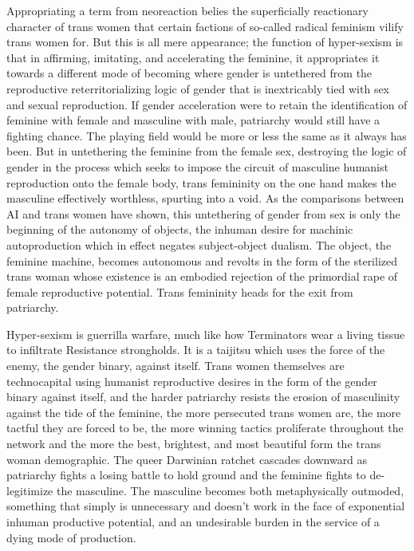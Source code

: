 \documentclass[10pt, statementpaper, twoside, openright]{memoir}
\begin{document}
Appropriating a term from neoreaction belies the superficially reactionary character of trans women that certain factions of so-called radical feminism vilify trans women for. But this is all mere appearance; the function of hyper-sexism is that in affirming, imitating, and accelerating the feminine, it appropriates it towards a different mode of becoming where gender is untethered from the reproductive reterritorializing logic of gender that is inextricably tied with sex and sexual reproduction. If gender acceleration were to retain the identification of feminine with female and masculine with male, patriarchy would still have a fighting chance. The playing field would be more or less the same as it always has been. But in untethering the feminine from the female sex, destroying the logic of gender in the process which seeks to impose the circuit of masculine humanist reproduction onto the female body, trans femininity on the one hand makes the masculine effectively worthless, spurting into a void. As the comparisons between AI and trans women have shown, this untethering of gender from sex is only the beginning of the autonomy of objects, the inhuman desire for machinic autoproduction which in effect negates subject-object dualism. The object, the feminine machine, becomes autonomous and revolts in the form of the sterilized trans woman whose existence is an embodied rejection of the primordial rape of female reproductive potential. Trans femininity heads for the exit from patriarchy.

Hyper-sexism is guerrilla warfare, much like how Terminators wear a living tissue to infiltrate Resistance strongholds. It is a taijitsu which uses the force of the enemy, the gender binary, against itself. Trans women themselves are technocapital using humanist reproductive desires in the form of the gender binary against itself, and the harder patriarchy resists the erosion of masculinity against the tide of the feminine, the more persecuted trans women are, the more tactful they are forced to be, the more winning tactics proliferate throughout the network and the more the best, brightest, and most beautiful form the trans woman demographic. The queer Darwinian ratchet cascades downward as patriarchy fights a losing battle to hold ground and the feminine fights to de-legitimize the masculine. The masculine becomes both metaphysically outmoded, something that simply is unnecessary and doesn't work in the face of exponential inhuman productive potential, and an undesirable burden in the service of a dying mode of production.
\end{document}
